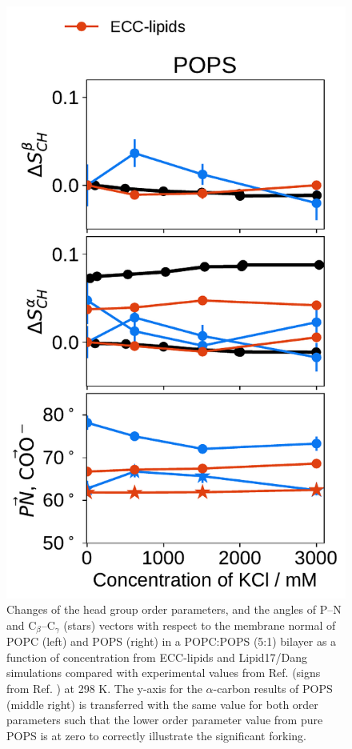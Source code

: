 \documentclass[journal=jpcbfk,manuscript=article]{achemso}
\newlength{\figheight}
\begin{document}
\begin{figure}[tbp!]
  \includegraphics[height=\figheight]{../img/ecc_pops/order_parameters_changes_ecc-lip_L14_A-B-PN-COO_POPS_kcl.pdf} 
  \caption{\label{fig:delta_ordPar_KCl_PCPS}
    Changes of the head group order parameters, and the angles of P--N and C$_\beta$--C$_\gamma$ (stars) vectors 
    with respect to the membrane normal of POPC (left) and POPS (right) in a POPC:POPS (5:1) bilayer 
    as a function of  concentration from ECC-lipids and Lipid17/Dang simulations 
    compared with experimental values from Ref.  (signs from Ref. ) at 298 K.
    The y-axis for the $\alpha$-carbon results of POPS (middle right) is transferred
    with the same value for both order parameters such that the lower order
    parameter value from pure POPS is at zero to correctly illustrate the significant forking.
  }
\end{figure} 
 
\end{document}
